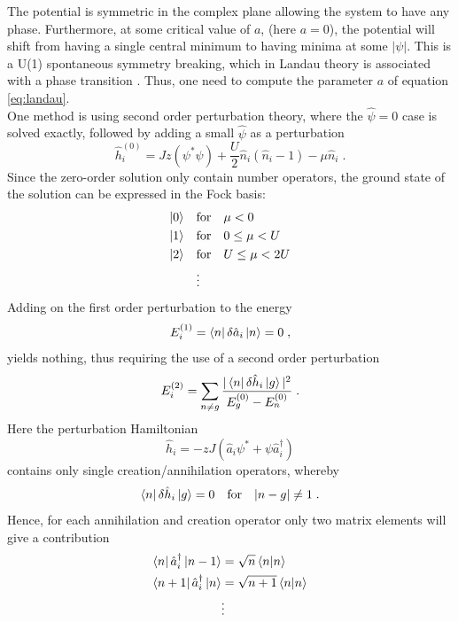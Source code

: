 The potential is symmetric in the complex plane allowing the system to have any phase. Furthermore, at some critical value of $a$, (here $a = 0$), the potential will shift from having a single central minimum to having minima at some $|\psi|$. This is a U(1) spontaneous symmetry breaking, which in Landau theory is associated with a phase transition \cite{plischke}. Thus, one need to compute the parameter $a$ of equation \eqref{eq:landau}.\\
One method is using second order perturbation theory, where the $\hat{\psi} = 0$ case is solved exactly, followed by adding a small $\hat{\psi}$ as a perturbation
\begin{equation}
	\hat{h}_{i}^{(0)} = J z \left( \psi^* \psi \right) + \frac{U}{2} \hat{n}_i \left( \hat{n}_i -1 \right) - \mu \hat{n}_i \; .
\end{equation} 
Since the zero-order solution only contain number operators, the ground state of the solution can be expressed in the Fock basis:
\begin{align*}
	\ket{0} \quad &\text{for} \quad \mu < 0 \\
	\ket{1} \quad &\text{for} \quad 0 \leq \mu < U \\
	\ket{2} \quad &\text{for} \quad U \leq \mu < 2 U \\
	& \vdots
\end{align*} 
Adding on the first order perturbation to the energy
\begin{equation}
	E_{i}^{(1)} = \bra{n} \delta \hat{a}_i \ket{n} = 0 \; ,
\end{equation}
yields nothing, thus requiring the use of a second order perturbation
\begin{equation}
	E_{i}^{(2)} = \sum_{n \neq g} \frac{|\bra{n} \delta \hat{h}_i \ket{g}|^2}{E_{g}^{(0)} - E_{n}^{(0)}} \; .
\end{equation}
Here the perturbation Hamiltonian
\begin{equation}
	\hat{h}_i = - z J \left( \hat{a}_i \psi^* + \psi \hat{a}_{i}^{\dag} \right)
\end{equation}
contains only single creation/annihilation operators, whereby
\begin{equation}
	\bra{n} \delta \hat{h}_i \ket{g} = 0 \quad \text{for} \quad |n - g| \neq 1 \; .
\end{equation}
Hence, for each annihilation and creation operator only two matrix elements will give a contribution
\begin{align*}
	\bra{n}  \hat{a}_{i}^{\dag} \ket{n-1} &= \sqrt{n} \braket{n|n} \\
	\bra{n+1}  \hat{a}_{i}^{\dag} \ket{n} &= \sqrt{n+1} \braket{n|n} \\
	& \vdots
\end{align*}
